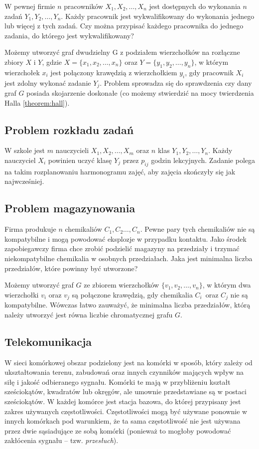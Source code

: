 W pewnej firmie $n$ pracowników $X_1,X_2,\ldots,X_n$ jest dostępnych do wykonania $n$ zadań $Y_1,Y_2,\ldots,Y_n$. Każdy pracownik jest wykwalifikowany do wykonania jednego lub więcej z tych zadań. Czy można przypisać każdego pracownika do jednego zadania, do którego jest wykwalifikowany? 

Możemy utworzyć graf dwudzielny G z podziałem wierzchołków na rozłączne zbiory $X$ i $Y$, gdzie $X=\{x_1,x_2,\ldots,x_n\}$ oraz $Y=\{y_1,y_2,\ldots,y_n\}$, w którym wierzchołek $x_i$ jest połączony krawędzią z wierzchołkiem $y_i$, gdy pracownik $X_i$ jest zdolny wykonać zadanie $Y_j$. Problem sprowadza się do sprawdzenia czy dany graf $G$ posiada skojarzenie doskonałe (co możemy stwierdzić na mocy twierdzenia Halla \ref{theorem:hall}).


\subsection*{Problem rozkładu zadań}

W szkole jest $m$ nauczycieli $X_1,X_2,\ldots,X_m$ oraz $n$ klas $Y_1,Y_2,\ldots,Y_n$. Każdy nauczyciel $X_i$ powinien uczyć klasę $Y_j$ przez $p_{ij}$ godzin lekcyjnych. Zadanie polega na takim rozplanowaniu harmonogramu zajęć, aby zajęcia skończyły się jak najwcześniej. 


\subsection*{Problem magazynowania}

Firma produkuje $n$ chemikaliów $C_1,C_2\ldots,C_n$. Pewne pary tych chemikaliów nie są kompatybilne i mogą powodować eksplozje w przypadku kontaktu. Jako środek zapobiegawczy firma chce zrobić podzielić magazyny na przedziały i trzymać niekompatybilne chemikalia w osobnych przedziałach. Jaka jest minimalna liczba przedziałów, które powinny być utworzone?

Możemy utworzyć graf $G$ ze zbiorem wierzchołków $\{v_1,v_2,\ldots,v_n\}$, w którym dwa wierzchołki $v_i$ oraz $v_j$ są połączone krawędzią, gdy chemikalia $C_i$~oraz $C_j$ nie są kompatybilne. Wówczas łatwo zauważyć, że minimalna liczba przedziałów, którą należy utworzyć jest równa liczbie chromatycznej grafu $G$. 


\subsection*{Telekomunikacja}

W sieci komórkowej obszar podzielony jest na komórki w sposób, który zależy od  ukształtowania terenu, zabudowań oraz innych czynników mających wpływ na siłę i jakość odbieranego sygnału. Komórki te mają w przybliżeniu kształt sześciokątów, kwadratów lub okręgów, ale umownie przedstawiane są w postaci sześciokątów. W każdej komórce jest stacja bazowa, do której przypisany jest zakres używanych częstotliwości. Częstotliwości mogą być używane ponownie w innych komórkach pod warunkiem, że ta sama częstotliwość nie jest używana przez dwie sąsiadujące ze sobą komórki (ponieważ to mogłoby powodować zakłócenia sygnału -- tzw. \emph{przesłuch}).

